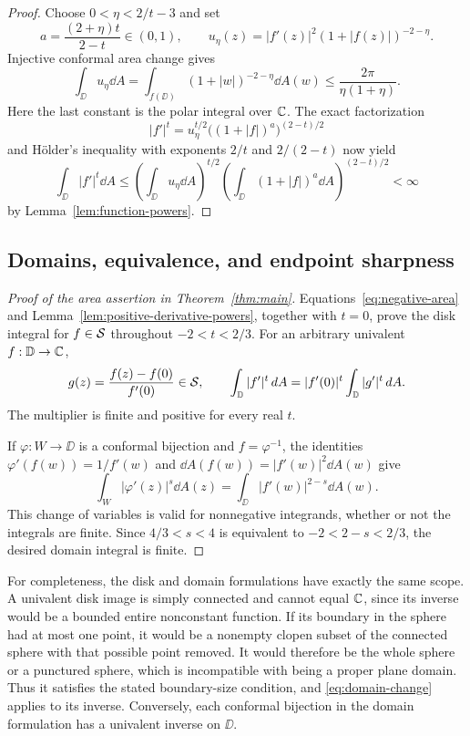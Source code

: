 \begin{proof}
 Choose $0<\eta<2/t-3$ and set
 \[
  a=\frac{(2+\eta)t}{2-t}\in(0,1),\qquad
  u_\eta(z)=|f'(z)|^2(1+|f(z)|)^{-2-\eta}.
 \]
 Injective conformal area change gives
 \begin{equation}\label{eq:weighted-derivative-area}
  \int_{\DD}u_\eta\dd A
   =\int_{f(\DD)}(1+|w|)^{-2-\eta}\dd A(w)
   \leq\frac{2\pi}{\eta(1+\eta)}.
 \end{equation}
 Here the last constant is the polar integral over $\mathbb C$.
 The exact factorization
 \[
  |f'|^t=u_\eta^{t/2}\bigl((1+|f|)^a\bigr)^{(2-t)/2}
 \]
 and H\"older's inequality with exponents $2/t$ and $2/(2-t)$
 now yield
 \[
  \int_{\DD}|f'|^t\dd A
   \leq
    \left(\int_{\DD}u_\eta\dd A\right)^{t/2}
    \left(\int_{\DD}(1+|f|)^a\dd A\right)^{(2-t)/2}<\infty
 \]
 by Lemma~\ref{lem:function-powers}.
\end{proof}

\subsection{Domains, equivalence, and endpoint sharpness}

\begin{proof}[Proof of the area assertion in Theorem~\ref{thm:main}]
 Equations~\eqref{eq:negative-area} and
 Lemma~\ref{lem:positive-derivative-powers}, together with $t=0$,
 prove the disk integral for $f\in\mathcal S$ throughout
 $-2<t<2/3$.  For an arbitrary univalent $f:\mathbb D\to\mathbb C$,
 \[
  g(z)=\frac{f(z)-f(0)}{f'(0)}\in\mathcal S,\qquad
  \int_{\mathbb D}|f'|^t\,d A
    =|f'(0)|^t\int_{\mathbb D}|g'|^t\,d A.
 \]
 The multiplier is finite and positive for every real $t$.

 If $\varphi:W\to\DD$ is a conformal bijection and
 $f=\varphi^{-1}$, the identities
 $\varphi'(f(w))=1/f'(w)$ and
 $\dd A(f(w))=|f'(w)|^2\dd A(w)$ give
 \begin{equation}\label{eq:domain-change}
  \int_W|\varphi'(z)|^s\dd A(z)
    =\int_{\DD}|f'(w)|^{2-s}\dd A(w).
 \end{equation}
 This change of variables is valid for nonnegative integrands,
 whether or not the integrals are finite.  Since
 $4/3<s<4$ is equivalent to $-2<2-s<2/3$, the desired domain
 integral is finite.
\end{proof}

For completeness, the disk and domain formulations have exactly
the same scope.  A univalent disk image is simply connected and
cannot equal $\mathbb C$, since its inverse would be a bounded entire
nonconstant function.  If its boundary in the sphere had at most
one point, it would be a nonempty clopen subset of the connected
sphere with that possible point removed.  It would therefore be
the whole sphere or a punctured sphere, which is incompatible
with being a proper plane domain.  Thus it satisfies the stated
boundary-size condition, and \eqref{eq:domain-change} applies to
its inverse.  Conversely, each conformal bijection in the domain
formulation has a univalent inverse on $\DD$.

